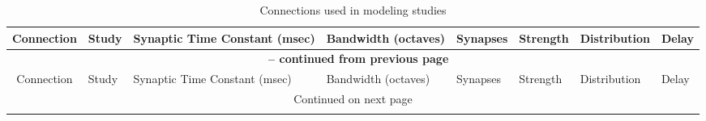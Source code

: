 
\begin{longtable}{cXXXXXXX}%
%
\caption{Connections  used in modeling studies} \\
\toprule  
           Connection            &                      Study                       &                                           Synaptic Time Constant (msec)                                            &                    Bandwidth (octaves)                    &                 Synapses                  &                                          Strength                                           &               Distribution                & Delay\\ \midrule 
\endfirsthead

\multicolumn{8}{c}{{\bfseries \tablename\ \thetable{} -- continued from previous page}} \\
      \midrule  Connection       &                      Study                       &                                           Synaptic Time Constant (msec)                                            &                    Bandwidth (octaves)                    &                 Synapses                  &                                          Strength                                           &               Distribution                & Delay\\ \midrule 
\endhead

\midrule \multicolumn{8}{c}{{Continued on next page}} \\ %
\endfoot
\bottomrule
\endlastfoot


\end{longtable}

